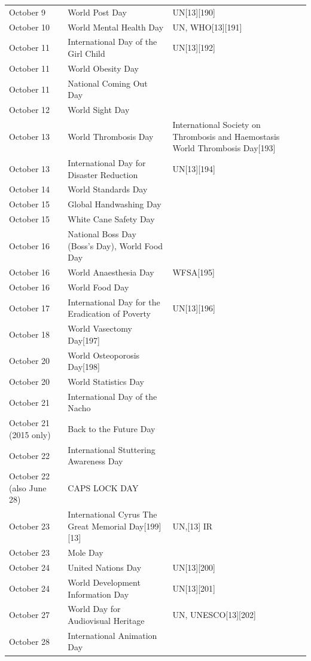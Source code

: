 \documentclass[
  openany]{book}
\begin{document}
\begin{longtable}[t]{>{\raggedright\arraybackslash}p{8em}>{\raggedright\arraybackslash}p{20em}>{\raggedright\arraybackslash}p{12em}}
October 9 & World Post Day & UN[13][190]\\
October 10 & World Mental Health Day & UN, WHO[13][191]\\
October 11 & International Day of the Girl Child & UN[13][192]\\
October 11 & World Obesity Day & \\
\addlinespace
October 11 & National Coming Out Day & \\
October 12 & World Sight Day & \\
October 13 & World Thrombosis Day & International Society on Thrombosis and Haemostasis World Thrombosis Day[193]\\
October 13 & International Day for Disaster Reduction & UN[13][194]\\
October 14 & World Standards Day & \\
\addlinespace
October 15 & Global Handwashing Day & \\
October 15 & White Cane Safety Day & \\
October 16 & National Boss Day (Boss's Day), World Food Day & \\
October 16 & World Anaesthesia Day & WFSA[195]\\
October 16 & World Food Day & \\
\addlinespace
October 17 & International Day for the Eradication of Poverty & UN[13][196]\\
October 18 & World Vasectomy Day[197] & \\
October 20 & World Osteoporosis Day[198] & \\
October 20 & World Statistics Day & \\
October 21 & International Day of the Nacho & \\
\addlinespace
October 21 (2015 only) & Back to the Future Day & \\
October 22 & International Stuttering Awareness Day & \\
October 22 (also June 28) & CAPS LOCK DAY & \\
October 23 & International Cyrus The Great Memorial Day[199][13] & UN,[13] IR\\
October 23 & Mole Day & \\
\addlinespace
October 24 & United Nations Day & UN[13][200]\\
October 24 & World Development Information Day & UN[13][201]\\
October 27 & World Day for Audiovisual Heritage & UN, UNESCO[13][202]\\
October 28 & International Animation Day & \\

\end{longtable}
\end{document}
